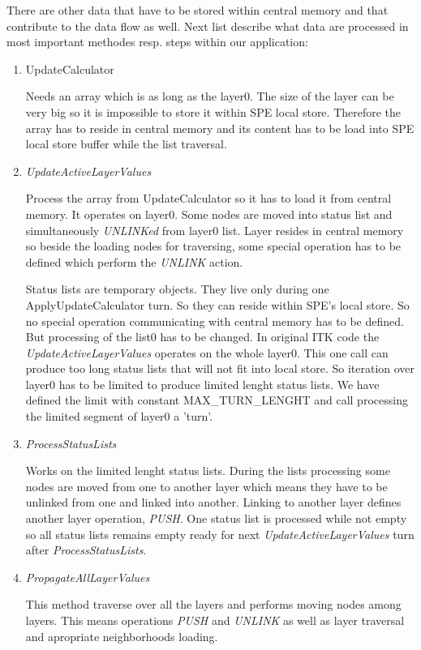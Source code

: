 \par
There are other data that have to be stored within central memory and that contribute to the data flow as well.
Next list describe what data are processed in most important methodes resp. steps within our application:
\begin{enumerate}
\item UpdateCalculator
\par
Needs an array which is as long as the layer0.
The size of the layer can be very big so it is impossible to store it within SPE local store.
Therefore the array has to reside in central memory and its content has to be load into SPE local store buffer while the list traversal.

\item \emph{UpdateActiveLayerValues}
\par
Process the array from UpdateCalculator so it has to load it from central memory.
It operates on layer0.
Some nodes are moved into status list and simultaneously \emph{UNLINKed} from layer0 list.
Layer resides in central memory so beside the loading nodes for traversing, some special operation has to be defined which perform the \emph{UNLINK} action.
\par
Status lists are temporary objects. They live only during one ApplyUpdateCalculator turn.
So they can reside within SPE's local store.
So no special operation communicating with central memory has to be defined.
But processing of the list0 has to be changed.
In original ITK code the \emph{UpdateActiveLayerValues} operates on the whole layer0.
This one call can produce too long status lists that will not fit into local store.
So iteration over layer0 has to be limited to produce limited lenght status lists.
We have defined the limit with constant MAX\_TURN\_LENGHT and call processing the limited segment of layer0 a 'turn'.

\item \emph{ProcessStatusLists}
\par
Works on the limited lenght status lists.
During the lists processing some nodes are moved from one to another layer which means they have to be unlinked from one and linked into another.
Linking to another layer defines another layer operation, \emph{PUSH}.
One status list is processed while not empty so all status lists remains empty ready for next \emph{UpdateActiveLayerValues} turn after \emph{ProcessStatusLists}.

\item \emph{PropagateAllLayerValues}
\par
This method traverse over all the layers and performs moving nodes among layers.
This means operations \emph{PUSH} and \emph{UNLINK} as well as layer traversal and apropriate neighborhoods loading.
\end{enumerate}

